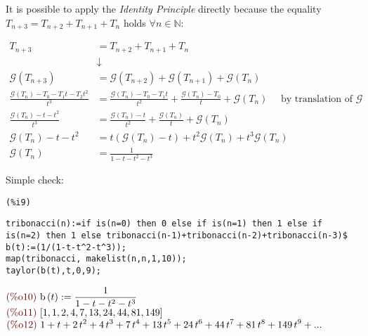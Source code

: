 It is possible to apply the \emph{Identity Principle} directly because
the equality $T_{n+3} = T_{n+2} + T_{n+1} + T_{n}$ holds $\forall n
\in \mathbb{N} $:

\begin{displaymath}
  \begin{split}
    T_{n+3} &=T_{n+2}+ T_{n+1} + T_{n}  \\
    &\downarrow \\
    \mathcal{G} (T_{n+3}) &= \mathcal{G} (T_{n+2}) + \mathcal{G}
    (T_{n+1}) + \mathcal{G}
    (T_{n}) \\
    \frac{\mathcal{G} (T_n) - T_0 - T_1 t - T_2t^2}{t^3} &=
    \frac{\mathcal{G} (T_n) - T_0 - T_1 t}{t^2} + \frac{\mathcal{G}
      (T_n) - T_0}{t} + \mathcal{G}
    (T_{n}) \quad \text{ by translation of } \mathcal{G} \\
    \frac{\mathcal{G} (T_n) - t - t^2}{t^3} &= \frac{\mathcal{G} (T_n)
      - t}{t^2} + \frac{\mathcal{G} (T_n) }{t} + \mathcal{G}
    (T_{n})\\
    \mathcal{G} (T_n) - t - t^2 &= t(\mathcal{G} (T_n) - t) +
    t^2\mathcal{G} (T_n) + t^3\mathcal{G}
    (T_{n})\\
    \mathcal{G} (T_n) &= \frac{1}{1-t-t^2-t^3
}
  \end{split}
\end{displaymath}

Simple check:


\noindent
\begin{minipage}[t]{8ex}{\color{red}\bf
\begin{verbatim}
(%i9) 
\end{verbatim}}
\end{minipage}
\begin{minipage}[t]{\textwidth}{\color{blue}
\begin{verbatim}
tribonacci(n):=if is(n=0) then 0 else if is(n=1) then 1 else if
is(n=2) then 1 else tribonacci(n-1)+tribonacci(n-2)+tribonacci(n-3)$
b(t):=(1/(1-t-t^2-t^3));
map(tribonacci, makelist(n,n,1,10));
taylor(b(t),t,0,9);
\end{verbatim}}
\end{minipage}
\begin{math}\displaystyle
\parbox{8ex}{\color{labelcolor}(\%o10) }
\mathrm{b}\left( t\right) :=\frac{1}{1-t-{t}^{2}-{t}^{3}}
\end{math}\\
\begin{math}\displaystyle
\parbox{8ex}{\color{labelcolor}(\%o11) }
[1,1,2,4,7,13,24,44,81,149]
\end{math}\\
\begin{math}\displaystyle
\parbox{8ex}{\color{labelcolor}(\%o12) }
1+t+2\,{t}^{2}+4\,{t}^{3}+7\,{t}^{4}+13\,{t}^{5}+24\,{t}^{6}+44\,{t}^{7}+81\,{t}^{8}+149\,{t}^{9}+...
\end{math}





